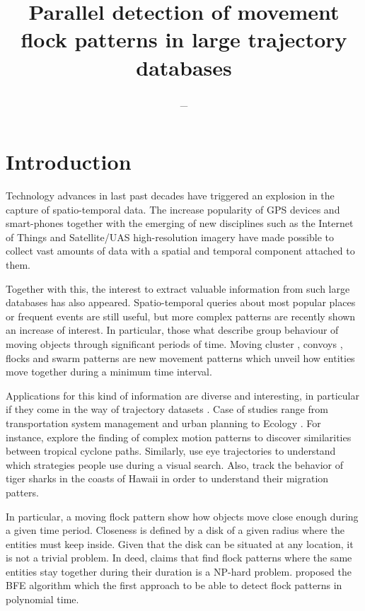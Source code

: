 \documentclass[12pt]{scrartcl}
\title{Parallel detection of movement flock patterns in large trajectory databases}
\author{_}
\begin{document}
\maketitle
 
\section{Introduction}
Technology advances in last past decades have triggered an explosion in the capture of spatio-temporal data.  The increase popularity of GPS devices and smart-phones together with the emerging of new disciplines such as the Internet of Things and Satellite/UAS high-resolution imagery have made possible to collect vast amounts of data with a spatial and temporal component attached to them.

Together with this, the interest to extract valuable information from such large databases has also appeared.  Spatio-temporal queries about most popular places or frequent events are still useful, but more complex patterns are recently shown an increase of interest.  In particular, those what describe group behaviour of moving objects through significant periods of time.  Moving cluster \citep{kalnis_discovering_2005}, convoys \citep{jeung_discovery_2008}, flocks \citep{gudmundsson_computing_2006} and swarm patterns \citep{li_swarm:_2010} are new movement patterns which unveil how entities move together during a minimum time interval. 

Applications for this kind of information are diverse and interesting, in particular if they come in the way of trajectory datasets \citep{jeung_trajectory_2011, huang_mining_2015}. Case of studies range from transportation system management and urban planning \citep{di_lorenzo_allaboard:_2016} to Ecology \citep{la_sorte_convergence_2016}.  For instance, \cite{turdukulov_visual_2014} explore the finding of complex motion patterns to discover similarities between tropical cyclone paths.  Similarly, \cite{amor_persistence_2016} use eye trajectories to understand which strategies people use during a visual search. Also, \cite{holland_movements_1999} track the behavior of tiger sharks in the coasts of Hawaii in order to understand their migration patters.

In particular, a moving flock pattern show how objects move close enough during a given time period.  Closeness is defined by a disk of a given radius where the entities must keep inside.  Given that the disk can be situated at any location, it is not a trivial problem.  In deed, \cite{gudmundsson_computing_2006} claims that find flock patterns where the same entities stay together during their duration is a NP-hard problem. \cite{vieira_-line_2009} proposed the BFE algorithm which the first approach to be able to detect flock patterns in polynomial time.
\end{document}
